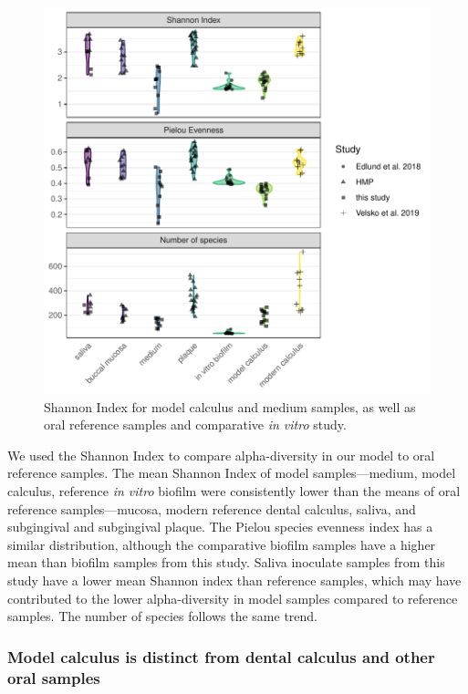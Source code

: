 \documentclass[
]{article}
\begin{document}
\begin{figure}

{\centering \includegraphics{index_files/figure-pdf/fig-shannon-compar-1.pdf}

}

\caption{\label{fig-shannon-compar}Shannon Index for model calculus and
medium samples, as well as oral reference samples and comparative
\emph{in vitro} study.}

\end{figure}

We used the Shannon Index to compare alpha-diversity in our model to
oral reference samples. The mean Shannon Index of model
samples---medium, model calculus, reference \emph{in vitro} biofilm were
consistently lower than the means of oral reference samples---mucosa,
modern reference dental calculus, saliva, and subgingival and
subgingival plaque. The Pielou species evenness index has a similar
distribution, although the comparative biofilm samples have a higher
mean than biofilm samples from this study. Saliva inoculate samples from
this study have a lower mean Shannon index than reference samples, which
may have contributed to the lower alpha-diversity in model samples
compared to reference samples. The number of species follows the same
trend.

\hypertarget{model-calculus-is-distinct-from-dental-calculus-and-other-oral-samples}{%
\subsubsection{Model calculus is distinct from dental calculus and other
oral
samples}\label{model-calculus-is-distinct-from-dental-calculus-and-other-oral-samples}}
\end{document}
